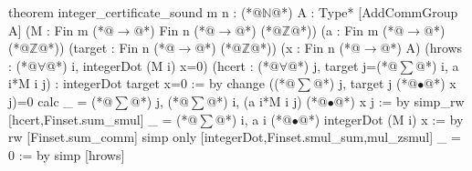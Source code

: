 theorem integer_certificate_sound {m n : (*@$\mathbb N$@*)} {A : Type*} [AddCommGroup A]
    (M : Fin m (*@$\to$@*) Fin n (*@$\to$@*) (*@$\mathbb Z$@*)) (a : Fin m (*@$\to$@*) (*@$\mathbb Z$@*)) (target : Fin n (*@$\to$@*) (*@$\mathbb Z$@*))
    (x : Fin n (*@$\to$@*) A) (hrows : (*@$\forall$@*) i, integerDot (M i) x=0)
    (hcert : (*@$\forall$@*) j, target j=(*@$\sum$@*) i, a i*M i j) : integerDot target x=0 := by
  change ((*@$\sum$@*) j, target j (*@$\bullet$@*) x j)=0
  calc
    _ = (*@$\sum$@*) j, (*@$\sum$@*) i, (a i*M i j) (*@$\bullet$@*) x j := by
      simp_rw [hcert,Finset.sum_smul]
    _ = (*@$\sum$@*) i, a i (*@$\bullet$@*) integerDot (M i) x := by
      rw [Finset.sum_comm]
      simp only [integerDot,Finset.smul_sum,mul_zsmul]
    _ = 0 := by simp [hrows]
